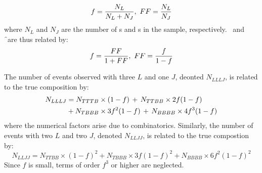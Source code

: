 \begin{equation}
f = \frac{N_{L}}{N_{L} + N_{J}},\ FF = \frac{N_{L}}{N_{J}}
\end{equation}
where $N_{L}$ and $N_{J}$ are the number of \sellep s and \lljet s in the sample,
respectively. \FF\ and \f\ are thus related by:
\begin{equation}
f = \frac{FF}{1 + FF},\ FF = \frac{f}{1-f}
\label{eqn:bg-f-FF-relations}
\end{equation}


The number of events observed with three $L$ and one $J$, deonted $N_{LLLJ}$, is related to
the true composition by:
\begin{align}
N_{LLLJ} &= N_{TTTB} \times (1-f)\, +\, N_{TTBB} \times 2f(1-f) \notag \\
         &+ N_{TBBB} \times 3f^{2}(1-f)\, +\,  N_{BBBB} \times 4f^{3}(1-f) 
\end{align}
where the numerical factors arise due to combinatorics. Similarly, the number of
events with two $L$ and two $J$, denoted $N_{LLJJ}$, is related to the
true compostion by:
\begin{equation}
N_{LLJJ} = N_{TTBB} \times (1-f)^{2} + N_{TBBB} \times 3 f(1-f)^{2}  + N_{BBBB}
\times 6 f^{2}(1-f)^{2}
\end{equation}
Since $f$ is small,
terms of order $f^{3}$ or higher are neglected.

